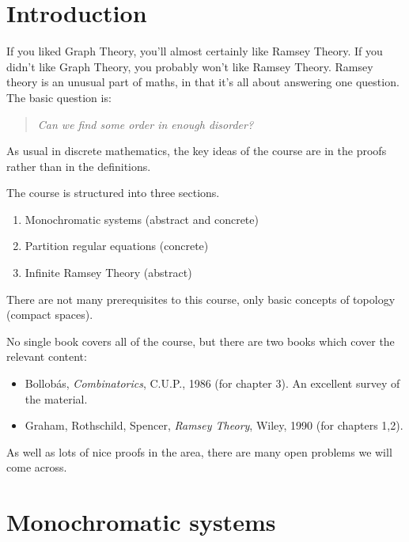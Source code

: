 \documentclass{article}
\begin{document}
\maketitle

\tableofcontents

\clearpage
\section{Introduction}

\newlec
If you liked Graph Theory, you'll almost certainly like Ramsey Theory. If you didn't like Graph Theory, you probably won't like Ramsey Theory.
Ramsey theory is an unusual part of maths, in that it's all about answering one question. The basic question is:
\begin{quotation}
    \textit{Can we find some order in enough disorder?}
\end{quotation}

As usual in discrete mathematics, the key ideas of the course are in the proofs rather than in the definitions.

The course is structured into three sections.
\begin{enumerate}[label=\bfseries Chapter \arabic*:, leftmargin=*]
  \item Monochromatic systems (abstract and concrete)
  \item Partition regular equations (concrete)
  \item Infinite Ramsey Theory (abstract)
\end{enumerate}
There are not many prerequisites to this course, only basic concepts of topology (compact spaces).

No single book covers all of the course, but there are two books which cover the relevant content:
\begin{itemize}
  \item Bollob\'as, \textit{Combinatorics}, C.U.P., 1986 (for chapter 3). An excellent survey of the material.
  \item Graham, Rothschild, Spencer, \textit{Ramsey Theory}, Wiley, 1990 (for chapters 1,2).
\end{itemize}

As well as lots of nice proofs in the area, there are many open problems we will come across.

\clearpage
\section{Monochromatic systems}
\end{document}
